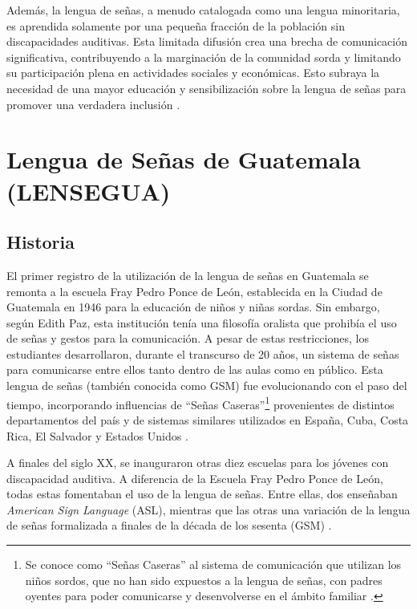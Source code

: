 Además, la lengua de señas, a menudo catalogada como una lengua minoritaria, es aprendida solamente por una pequeña fracción de la población sin discapacidades auditivas. Esta limitada difusión crea una brecha de comunicación significativa, contribuyendo a la marginación de la comunidad sorda y limitando su participación plena en actividades sociales y económicas. Esto subraya la necesidad de una mayor educación y sensibilización sobre la lengua de señas para promover una verdadera inclusión \cite{MelendezLabrador2021}.

\section{Lengua de Señas de Guatemala (LENSEGUA)}

\subsection{Historia}

El primer registro de la utilización de la lengua de señas en Guatemala se remonta a la escuela Fray Pedro Ponce de León, establecida en la Ciudad de Guatemala en 1946 para la educación de niños y niñas sordas. Sin embargo, según Edith Paz, esta institución tenía una filosofía oralista que prohibía el uso de señas y gestos para la comunicación. A pesar de estas restricciones, los estudiantes desarrollaron, durante el transcurso de 20 años, un sistema de señas para comunicarse entre ellos tanto dentro de las aulas como en público. Esta lengua de señas (también conocida como GSM) fue evolucionando con el paso del tiempo, incorporando influencias de ``Señas Caseras''\footnote{Se conoce como ``Señas Caseras'' al sistema de comunicación que utilizan los niños sordos, que no han sido expuestos a la lengua de señas, con padres oyentes para poder comunicarse y desenvolverse en el ámbito familiar \cite{EnSenasCultura}.} provenientes de distintos departamentos del país y de sistemas similares utilizados en España, Cuba, Costa Rica, El Salvador y Estados Unidos \cite{four}\cite{Aroche2022} .

A finales del siglo XX, se inauguraron otras diez escuelas para los jóvenes con discapacidad auditiva. A diferencia de la Escuela Fray Pedro Ponce de León, todas estas fomentaban el uso de la lengua de señas. Entre ellas, dos enseñaban \textit{American Sign Language} (ASL), mientras que las otras una variación de la lengua de señas formalizada a finales de la década de los sesenta (GSM) \cite{four}. 

